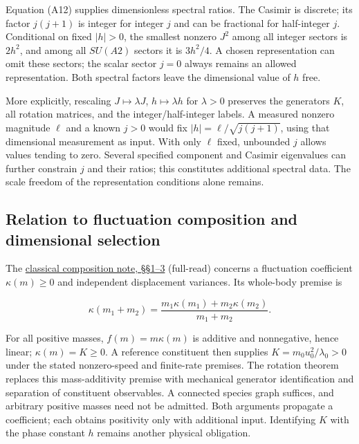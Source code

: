 \documentclass[11pt,a4paper]{article}
\begin{document}
Equation (A12) supplies dimensionless spectral ratios. The Casimir is
discrete; its factor \(j(j+1)\) is integer for integer \(j\) and can be
fractional for half-integer \(j\). Conditional on fixed \(|h|>0\), the
smallest nonzero \(J^2\) among all integer sectors is \(2h^2\), and
among all \(SU(A2)\) sectors it is \(3h^2/4\). A chosen representation
can omit these sectors; the scalar sector \(j=0\) always remains an
allowed representation. Both spectral factors leave the dimensional
value of \(h\) free.

More explicitly, rescaling \(J\mapsto\lambda J\), \(h\mapsto\lambda h\)
for \(\lambda>0\) preserves the generators \(K\), all rotation matrices,
and the integer/half-integer labels. A measured nonzero magnitude
\(\ell\) and a known \(j>0\) would fix \(|h|=\ell/\sqrt{j(j+1)}\), using
that dimensional measurement as input. With only \(\ell\) fixed,
unbounded \(j\) allows values tending to zero. Several specified
component and Casimir eigenvalues can further constrain \(j\) and their
ratios; this constitutes additional spectral data. The scale freedom of
the representation conditions alone remains.

\hypertarget{relation-to-fluctuation-composition-and-dimensional-selection}{%
\subsection{Relation to fluctuation composition and dimensional
selection}\label{relation-to-fluctuation-composition-and-dimensional-selection}}

The \href{composition-universality.md}{classical composition note,
§§1--3} (full-read) concerns a fluctuation coefficient \(\kappa(m)\ge0\)
and independent displacement variances. Its whole-body premise is

\[
\kappa(m_1+m_2)
=\frac{m_1\kappa(m_1)+m_2\kappa(m_2)}{m_1+m_2}.
\]

For all positive masses, \(f(m)=m\kappa(m)\) is additive and
nonnegative, hence linear; \(\kappa(m)=K\ge0\). A reference constituent
then supplies \(K=m_0u_0^2/\lambda_0>0\) under the stated nonzero-speed
and finite-rate premises. The rotation theorem replaces this
mass-additivity premise with mechanical generator identification and
separation of constituent observables. A connected species graph
suffices, and arbitrary positive masses need not be admitted. Both
arguments propagate a coefficient; each obtains positivity only with
additional input. Identifying \(K\) with the phase constant \(h\)
remains another physical obligation.
\end{document}
